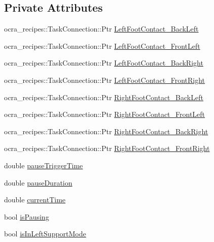 \subsection*{Private Attributes}
\begin{DoxyCompactItemize}
\item 
ocra\+\_\+recipes\+::\+Task\+Connection\+::\+Ptr \hyperlink{classSteppingDemoClient_a5dd71720cd8f7a17d21f74d20b3c23ff}{Left\+Foot\+Contact\+\_\+\+Back\+Left}
\item 
ocra\+\_\+recipes\+::\+Task\+Connection\+::\+Ptr \hyperlink{classSteppingDemoClient_a32e69816ec216b3d6502385e2346d22d}{Left\+Foot\+Contact\+\_\+\+Front\+Left}
\item 
ocra\+\_\+recipes\+::\+Task\+Connection\+::\+Ptr \hyperlink{classSteppingDemoClient_a946ab9de6d55274e5cb9b9a8743a30b8}{Left\+Foot\+Contact\+\_\+\+Back\+Right}
\item 
ocra\+\_\+recipes\+::\+Task\+Connection\+::\+Ptr \hyperlink{classSteppingDemoClient_ae2c0ca1ba0ef69b5f09fd3cd982fb772}{Left\+Foot\+Contact\+\_\+\+Front\+Right}
\item 
ocra\+\_\+recipes\+::\+Task\+Connection\+::\+Ptr \hyperlink{classSteppingDemoClient_aaaf5dee15bf151def4b4070751d1ca84}{Right\+Foot\+Contact\+\_\+\+Back\+Left}
\item 
ocra\+\_\+recipes\+::\+Task\+Connection\+::\+Ptr \hyperlink{classSteppingDemoClient_ad10f639e025b003fd383f4cc933da15f}{Right\+Foot\+Contact\+\_\+\+Front\+Left}
\item 
ocra\+\_\+recipes\+::\+Task\+Connection\+::\+Ptr \hyperlink{classSteppingDemoClient_a93e209732588c3ef2b04e39e3df40d3e}{Right\+Foot\+Contact\+\_\+\+Back\+Right}
\item 
ocra\+\_\+recipes\+::\+Task\+Connection\+::\+Ptr \hyperlink{classSteppingDemoClient_a781be1c0ffd7e7147eb2b2de66ba3231}{Right\+Foot\+Contact\+\_\+\+Front\+Right}
\item 
double \hyperlink{classSteppingDemoClient_a13a5deff16d52936f788bb9b0af6e9c9}{pause\+Trigger\+Time}
\item 
double \hyperlink{classSteppingDemoClient_a92b810b2d2c50e359da18e5d91163340}{pause\+Duration}
\item 
double \hyperlink{classSteppingDemoClient_a1bb7d42cf09778349ae1ecd31d2ac116}{current\+Time}
\item 
bool \hyperlink{classSteppingDemoClient_a29e7765300c7d2e2d5108025fbdcbc2c}{is\+Pausing}
\item 
bool \hyperlink{classSteppingDemoClient_a88b84ed8fc7808ea3fb68f2ec3d29ebe}{is\+In\+Left\+Support\+Mode}

\end{DoxyCompactItemize}
